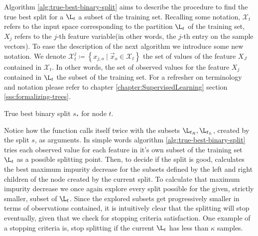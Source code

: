 Algorithm \ref{alg:true-best-binary-split} aims to describe the procedure to
find the true best split for a $\L_t$ a subset of the training set. Recalling
some notation, $\mathcal{X}_t$ refers to the input space corresponding to the
partition $\L_t$ of the training set, $X_j$ refers to the $j$-th feature
variable(in other words, the $j$-th entry on the sample vectors). To ease the
description of the next algorithm we introduce some new notation. We denote
$\mathcal{X}_{t}^{j} \coloneqq \left\{ x_{j, o} \mid \vec{x}_{o} \in
\mathcal{X}_t \right\}$ the set of values of the feature $X_J$ contained in
$\mathcal{X}_t$. In other words, the set of observed values for the feature
$X_j$ contained in $\L_t$ the subset of the training set. For a refresher on
terminology and notation please refer to chapter
\ref{chapter:SupervisedLearning} section \ref{sss:formalizing-trees}.

\begin{algorithm}
    \caption[True best binary split for node $t$.]{True best binary split $s_*$ for node $t$.}
    \label{alg:true-best-binary-split}
\end{algorithm}

Notice how the function \TrueBestSplit calls itself twice with the subsets
$\L_{t_R}, \L_{t_L}$, created by the split $s$, as arguments. In simple words
algorithm \ref{alg:true-best-binary-split} tries each observed value for each
feature in it's own subset of the training set $\L_t$ as a possible splitting
point. Then, to decide if the split is good, calculates the best maximum
impurity decrease for the subsets defined by the left and right children of the
node created by the current split. To calculate that maximum impurity decrease
we once again explore every split possible for the given, strictly smaller,
subset of $\L_t$. Since the explored subsets get progressively smaller in terms
of observations contained, it is intuitively clear that the splitting will stop
eventually, given that we check for stopping criteria satisfaction. One example
of a stopping criteria is, stop splitting if the current $\L_t$ has less
than $\kappa$ samples.

